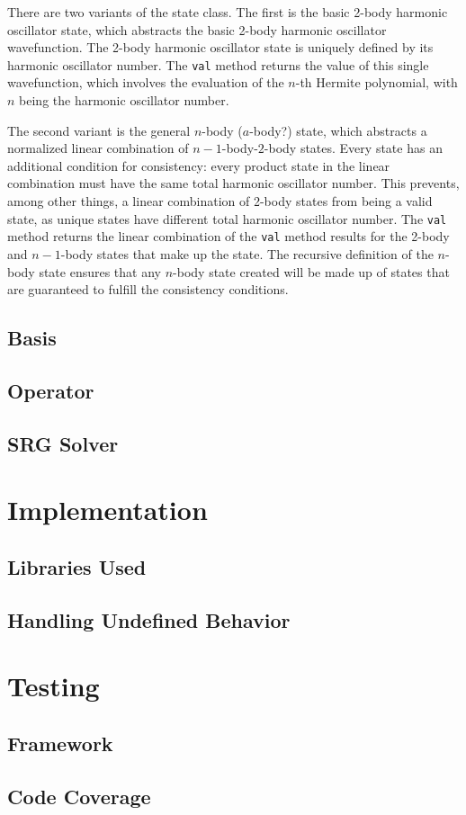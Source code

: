 There are two variants of the state class. The first is the basic 2-body harmonic oscillator state, which abstracts the basic 2-body harmonic oscillator wavefunction. The 2-body harmonic oscillator state is uniquely defined by its harmonic oscillator number. The \texttt{val} method returns the value of this single wavefunction, which involves the evaluation of the $n$-th Hermite polynomial, with $n$ being the harmonic oscillator number.

The second variant is the general $n$-body ($a$-body?) state, which abstracts a normalized linear combination of $n-1$-body-$2$-body states. Every state has an additional condition for consistency: every product state in the linear combination must have the same total harmonic oscillator number. This prevents, among other things, a linear combination of 2-body states from being a valid state, as unique states have different total harmonic oscillator number. The \texttt{val} method returns the linear combination of the \texttt{val} method results for the 2-body and $n-1$-body states that make up the state. The recursive definition of the $n$-body state ensures that any $n$-body state created will be made up of states that are guaranteed to fulfill the consistency conditions.

\subsection{Basis}

\subsection{Operator}

\subsection{SRG Solver}

\section{Implementation}

\subsection{Libraries Used}

\subsection{Handling Undefined Behavior}

\section{Testing}

\subsection{Framework}

\subsection{Code Coverage}


